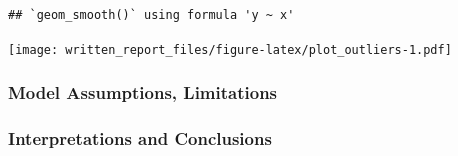 \documentclass[
]{article}
\begin{document}
\begin{verbatim}
## `geom_smooth()` using formula 'y ~ x'
\end{verbatim}

\texttt{[image: written\_report\_files/figure-latex/plot\_outliers-1.pdf]}

\hypertarget{model-assumptions-limitations}{%
\subsubsection{Model Assumptions,
Limitations}\label{model-assumptions-limitations}}

\hypertarget{interpretations-and-conclusions}{%
\subsubsection{Interpretations and
Conclusions}\label{interpretations-and-conclusions}}
\end{document}
